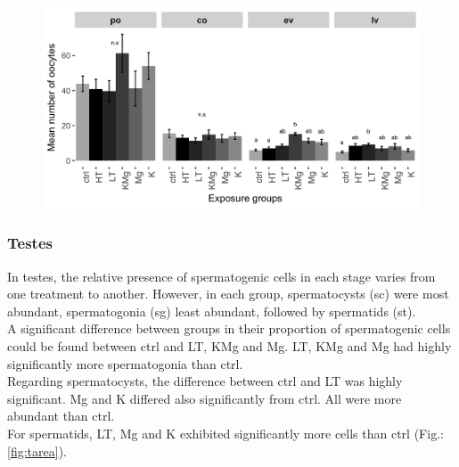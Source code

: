 \documentclass[twoside]{article}
\begin{document}
\begin{multicols}{2}
\begin{figure}[H]
 \centering
 \includegraphics[scale=.117]{ggbarlot_ova_numb2.png}
 \label{fig:ovnumb}
\end{figure}
\FloatBarrier



\subsubsection{Testes}
In testes, the relative presence of spermatogenic cells in each stage varies from one treatment to another. However, in each group, spermatocysts (sc) were most abundant, spermatogonia (sg) least abundant, followed by spermatids (st). \\
A significant difference between groups in their proportion of spermatogenic cells could be found between ctrl and LT, KMg and Mg. LT, KMg and Mg had highly significantly more spermatogonia than ctrl. \\
Regarding spermatocysts, the difference between ctrl and LT was highly significant. Mg and K differed also significantly from ctrl. All were more abundant than ctrl. \\
For spermatids, LT, Mg and K exhibited significantly more cells than ctrl (Fig.:\ref{fig:tarea}).


\end{multicols}
\end{document}
